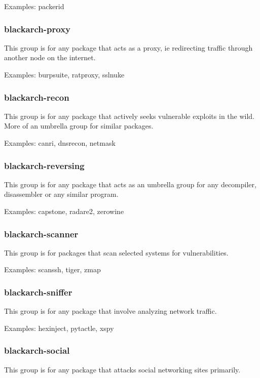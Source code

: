\documentclass[a4paper, oneside, 11pt]{book}
\begin{document}
Examples: packerid

\subsubsection{blackarch-proxy}

This group is for any package that acts as a proxy, ie redirecting traffic through another node on the internet.

Examples: burpsuite, ratproxy, sslnuke

\subsubsection{blackarch-recon}

This group is for any package that actively seeks vulnerable exploits in the wild. More of an umbrella group for similar packages.

Examples: canri, dnsrecon, netmask

\subsubsection{blackarch-reversing}

This group is for any package that acts as an umbrella group for any decompiler, disassembler or any similar program.

Examples: capstone, radare2, zerowine

\subsubsection{blackarch-scanner}

This group is for packages that scan selected systems for vulnerabilities. 

Examples: scanssh, tiger, zmap

\subsubsection{blackarch-sniffer}

This group is for any package that involve analyzing network traffic.

Examples: hexinject, pytactle, xspy

\subsubsection{blackarch-social}

This group is for any package that attacks social networking sites primarily.
\end{document}
